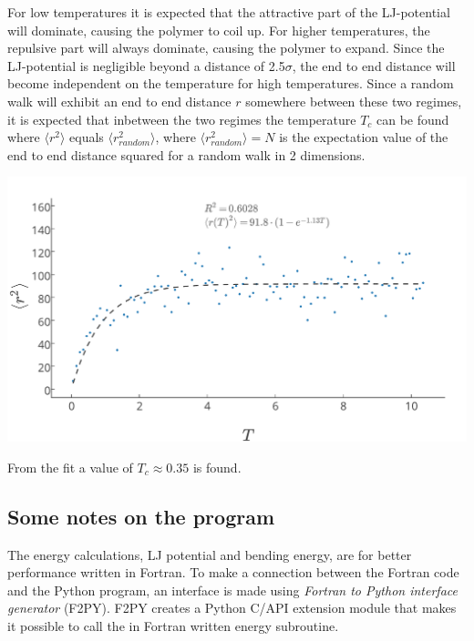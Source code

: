 For low temperatures it is expected that the attractive part of the LJ-potential will dominate, causing the polymer to coil up. For higher temperatures, the repulsive part will always dominate, causing the polymer to expand. Since the LJ-potential is negligible beyond a distance of 2.5$\sigma$, the end to end distance will become independent on the temperature for high temperatures. Since a random walk will exhibit an end to end distance $r$ somewhere between these two regimes, it is expected that inbetween the two regimes the temperature $T_c$ can be found where $\langle r^2 \rangle$ equals $\langle r_{random}^2 \rangle$, where $\langle r_{random}^2 \rangle = N$ is the expectation value of the end to end distance squared for a random walk in 2 dimensions.
\begin{Figure}
  \centerfloat
     \includegraphics[scale=0.4]{end_to_end_distance_as_function_of_the_temperature.pdf}
 \label{fig:end_to_end_afo_temperature}
\end{Figure}

From the fit a value of $T_c \approx 0.35$ is found.

\subsection{Some notes on the program}
The energy calculations, LJ potential and bending energy, are for better performance written in Fortran. To make a connection between the Fortran code and the Python program, an interface is made using \emph{Fortran to Python interface generator} (F2PY). F2PY creates a Python C/API extension module that makes it possible to call the in Fortran written energy subroutine.